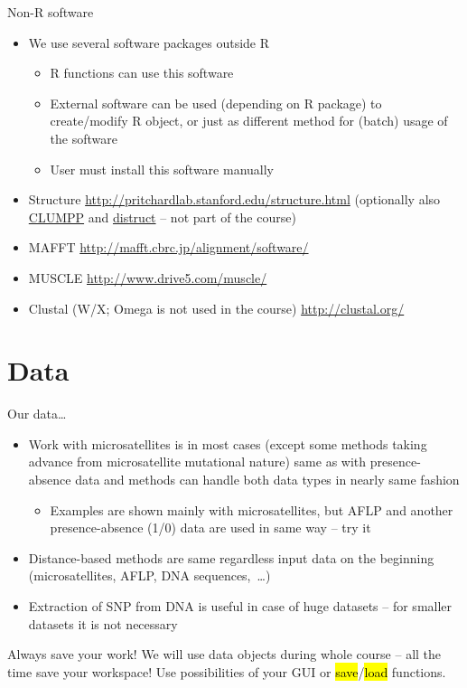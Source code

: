 \documentclass[compress, ucs, xelatex, 11pt, xcolor=svgnames,
  hyperref={
    bookmarks=true,
    unicode=true,
    colorlinks=true,
    pdftitle={Molecular data in R},
    plainpages=false,
    pdfauthor={Vojtech Zeisek},
    pdfsubject={Course about phylogeny and evolution in R},
    pdfcreator={XeLaTeX},
    pdfkeywords={R, evolution, phylogeny, molecular data},
    linkcolor=Tomato,
    anchorcolor=SaddleBrown,
    citecolor=Goldenrod,
    filecolor=DarkMagenta,
    menucolor=Sienna,
    urlcolor=DarkTurquoise,
    pdftex},
  url={hyphens, lowtilde} %
  ]{beamer}
\renewcommand{\texttt}[1]{\hl{\ttfamily #1}}
\begin{document}
\begin{frame}{Non-R software}
  \begin{itemize}
    \item We use several software packages outside R
    \begin{itemize}
      \item R functions can use this software
      \item External software can be used (depending on R package) to create/modify R object, or just as different method for (batch) usage of the software
      \item User must install this software manually
    \end{itemize}
    \item Structure \url{http://pritchardlab.stanford.edu/structure.html} (optionally also \href{https://web.stanford.edu/group/rosenberglab/clumpp.html}{CLUMPP} and \href{https://web.stanford.edu/group/rosenberglab/distruct.html}{distruct} -- not part of the course)
    \item MAFFT \url{http://mafft.cbrc.jp/alignment/software/}
    \item MUSCLE \url{http://www.drive5.com/muscle/}
    \item Clustal (W/X; Omega is not used in the course) \url{http://clustal.org/}
  \end{itemize}
\end{frame}

\section{Data}

\begin{frame}[allowframebreaks]{Our data\ldots}
  \begin{itemize}
    \item Work with microsatellites is in most cases (except some methods taking advance from microsatellite mutational nature) same as with presence-absence data and methods can handle both data types in nearly same fashion
    \begin{itemize}
      \item Examples are shown mainly with microsatellites, but AFLP and another presence-absence (1/0) data are used in same way -- try it
    \end{itemize}
    \item Distance-based methods are same regardless input data on the beginning (microsatellites, AFLP, DNA sequences,~\ldots)
    \item Extraction of SNP from DNA is useful in case of huge datasets -- for smaller datasets it is not necessary
  \end{itemize}
  \begin{block}{Always save your work!}
    \alert{We will use data objects during whole course -- all the time save your workspace!} Use possibilities of your GUI or \texttt{save}/\texttt{load} functions.
  \end{block}
\end{frame}
\end{document}
